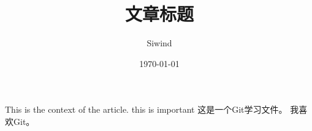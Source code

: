 \documentclass[UTF8]{ctexart}
\title{文章标题}
\author{Siwind}
\date{\today}
\begin{document}
    \maketitle
    This is the context of the article.
    this is important
    这是一个Git学习文件。
    我喜欢Git。
    
\end{document}

